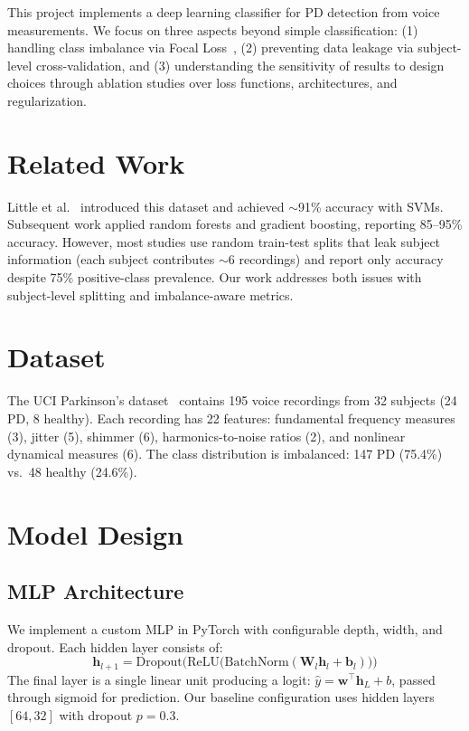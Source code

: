 \documentclass[11pt,a4paper]{article}
\begin{document}
This project implements a deep learning classifier for PD detection from voice
measurements. We focus on three aspects beyond simple classification: (1)
handling class imbalance via Focal Loss~\cite{lin2017focal}, (2) preventing
data leakage via subject-level cross-validation, and (3) understanding the
sensitivity of results to design choices through ablation studies over loss
functions, architectures, and regularization.


\section{Related Work}

Little et al.~\cite{little2007exploiting} introduced this dataset and achieved
$\sim$91\% accuracy with SVMs. Subsequent work applied random forests and
gradient boosting, reporting 85--95\% accuracy. However, most studies use
random train-test splits that leak subject information (each subject contributes
$\sim$6 recordings) and report only accuracy despite 75\% positive-class
prevalence. Our work addresses both issues with subject-level splitting and
imbalance-aware metrics.


\section{Dataset}

The UCI Parkinson's dataset~\cite{little2007exploiting} contains 195 voice
recordings from 32 subjects (24 PD, 8 healthy). Each recording has 22
features: fundamental frequency measures (3), jitter (5), shimmer (6),
harmonics-to-noise ratios (2), and nonlinear dynamical measures (6). The
class distribution is imbalanced: 147 PD (75.4\%) vs.\ 48 healthy (24.6\%).


\section{Model Design}

\subsection{MLP Architecture}

We implement a custom MLP in PyTorch with configurable depth, width, and
dropout. Each hidden layer consists of:
\begin{equation}
    \mathbf{h}_{l+1} = \mathrm{Dropout}\!\Big(\mathrm{ReLU}\!\big(\mathrm{BatchNorm}(\mathbf{W}_l \mathbf{h}_l + \mathbf{b}_l)\big)\Big)
\end{equation}
The final layer is a single linear unit producing a logit:
$\hat{y} = \mathbf{w}^\top \mathbf{h}_L + b$, passed through sigmoid for
prediction. Our baseline configuration uses hidden layers $[64, 32]$ with
dropout $p=0.3$.
\end{document}
